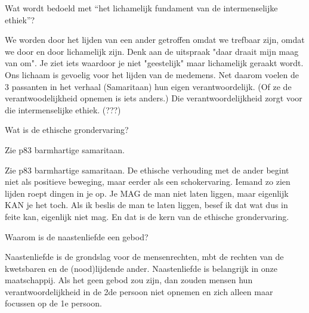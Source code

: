 \documentclass[main.tex]{subfiles}
\begin{document}
\begin{examenvraag}
    \begin{vraag}
        Wat wordt bedoeld met “het lichamelijk fundament van de intermenselijke ethiek”?
    \end{vraag}

    \begin{antwoord}
       We worden door het lijden van een ander getroffen omdat we trefbaar zijn, omdat we door en door lichamelijk zijn.
       Denk aan de uitspraak "daar draait mijn maag van om". 
       Je ziet iets waardoor je niet "geestelijk" maar lichamelijk geraakt wordt.
       Ons lichaam is gevoelig voor het lijden van de medemens.
       Net daarom voelen de 3 passanten in het verhaal (Samaritaan) hun eigen verantwoordelijk.
       (Of ze de verantwoodelijkheid opnemen is iets anders.)
       Die verantwoordelijkheid zorgt voor die intermenselijke ethiek. (???)

    \end{antwoord}
\end{examenvraag}


\begin{examenvraag}
    \begin{vraag}
        Wat is de ethische grondervaring?
    \end{vraag}
        Zie p83 barmhartige samaritaan.

    \begin{antwoord}
        Zie p83 barmhartige samaritaan.
        De ethische verhouding met de ander begint niet als positieve beweging, maar eerder als een schokervaring. 
        Iemand zo zien lijden roept dingen in je op.
        Je MAG de man niet laten liggen, maar eigenlijk KAN je het toch.
        Als ik beslis de man te laten liggen, besef ik dat wat dus in feite kan, eigenlijk niet mag. 
        En dat is de kern van de ethische grondervaring.
    \end{antwoord}
\end{examenvraag}


\begin{examenvraag}
    \begin{vraag}
        Waarom is de naastenliefde een gebod?
    \end{vraag}

    \begin{antwoord}
    Naastenliefde is de grondslag
    voor de mensenrechten, mbt de rechten van de kwetsbaren en de (nood)lijdende ander. Naastenliefde is belangrijk in onze maatschappij. Als het geen gebod zou zijn, dan zouden mensen hun verantwoordelijkheid in de 2de persoon niet opnemen en zich alleen maar focussen op de 1e persoon.
    \end{antwoord}
\end{examenvraag}
\end{document}
